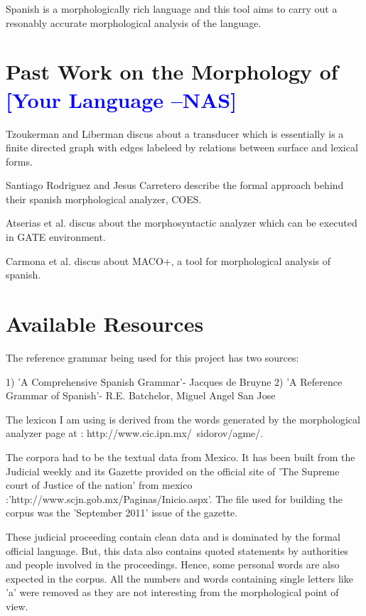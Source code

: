 \documentclass[11pt,letterpaper]{article}
\newcommand{\nascomment}[1]{\textcolor{blue}{\textbf{[#1 --NAS]}}}
\begin{document}
Spanish is a morphologically rich language and this tool aims to carry out a resonably accurate morphological analysis of the language. 

 

\section{Past Work on the Morphology of \nascomment{Your Language}}

Tzoukerman and Liberman discus about a transducer which is essentially is a finite directed graph with edges labeleed by relations between surface and lexical forms. 

Santiago Rodriguez and Jesus Carretero describe the formal approach behind their spanish morphological analyzer, COES. 

Atserias et al. discus about the morphosyntactic analyzer which can be executed in GATE environment.

Carmona et al. discus about MACO+, a tool for morphological analysis of spanish.

\section{Available Resources}

The reference grammar being used for this project has two sources:

1) 'A Comprehensive Spanish Grammar'- Jacques de Bruyne
2) 'A Reference Grammar of Spanish'- R.E. Batchelor, Miguel Angel San Jose

The lexicon I am using is derived from the words generated by the morphological analyzer page at : http://www.cic.ipn.mx/~sidorov/agme/.

The corpora had to be the textual data from Mexico. It has been built from the Judicial weekly and its Gazette provided on the official site of 'The Supreme court of Justice of the nation' from mexico :'http://www.scjn.gob.mx/Paginas/Inicio.aspx'. The file used for building the corpus was the 'September 2011' issue of the gazette.

These judicial proceeding contain clean data and is dominated by the formal official language. But, this data also contains quoted statements by authorities and people involved in the proceedings. Hence, some personal words are also expected in the corpus. All the numbers and words containing single letters like 'a' were removed as they are not interesting from the morphological point of view. 
\end{document}
